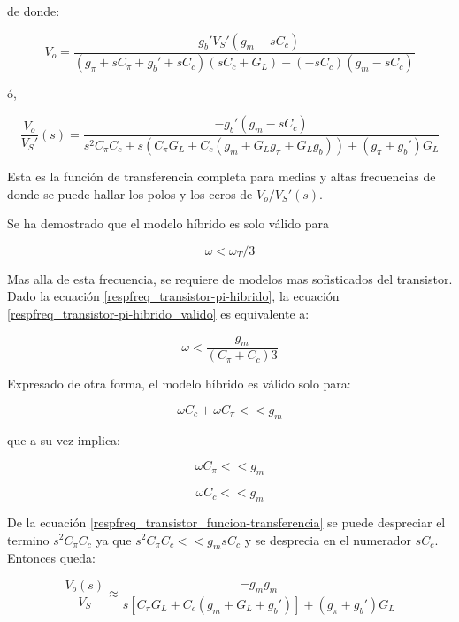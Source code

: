de donde:

\[ V_o = \frac{-g_b' V_S' (g_m - s C_c)}{(g_\pi + s C_\pi + g_b' + {s C_c}) (s C_c + G_L) - (-s C_c) (g_m - s C_c)} \]

ó,

\begin{equation} \label{respfreq_transistor_funcion-transferencia}
	\frac{V_o}{V_S'} (s) = \frac{-g_b' (g_m - s C_c)}{s^2 C_\pi C_c + s (C_\pi G_L + C_c (g_m + G_L g_\pi + G_L g_b)) + (g_\pi + g_b') G_L}
\end{equation}

Esta es la función de transferencia completa para medias y altas frecuencias de donde se puede hallar los polos y los ceros de \( V_o / V_S' (s) \).

Se ha demostrado que el modelo híbrido es solo válido para

\begin{equation} \label{respfreq_transistor-pi-hibrido_valido}
	\omega < \omega_T / 3
\end{equation}

Mas alla de esta frecuencia, se requiere de modelos mas sofisticados del transistor. Dado la ecuación \ref{respfreq_transistor-pi-hibrido}, la ecuación \ref{respfreq_transistor-pi-hibrido_valido} es equivalente a:

\begin{equation}
	\omega < \frac{g_m}{(C_\pi + C_c) 3}
\end{equation}

Expresado de otra forma, el modelo híbrido es válido solo para:

\begin{equation}
	\omega C_c + \omega C_\pi << g_m
\end{equation}

que a su vez implica:

\begin{equation}
	\omega C_\pi << g_m
\end{equation}

\begin{equation}
	\omega C_c << g_m
\end{equation}

De la ecuación \ref{respfreq_transistor_funcion-transferencia} se puede despreciar el termino \( s^2 C_\pi C_c \) ya que \( s^2 C_\pi C_c << g_m s C_c \) y se desprecia en el numerador \( s C_c \). Entonces queda:

\begin{equation}
	\frac{V_o (s)}{V_S} \approx \frac{-g_m g_m}{s [C_\pi G_L + C_c (g_m + G_L + g_b')] + (g_\pi + g_b') G_L}
\end{equation}

